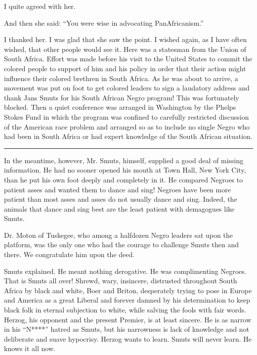 \documentclass[letterpaper,10pt,english]{jupyterBook}
\begin{document}
\sphinxAtStartPar
I quite agreed with her.

\sphinxAtStartPar
And then she said: “You were wise in advocating Pan\sphinxhyphen{}Africanism.”

\sphinxAtStartPar
I thanked her. I was glad that she saw the point. I wished again, as I have often wished, that other people would see it. Here was a statesman from the Union of South Africa. Effort was made before his visit to the United States to commit the colored people to support of him and his policy in order that their action might influence their colored brethren in South Africa. As he was about to arrive, a movement was put on foot to get colored leaders to sign a laudatory address and thank Jans Smuts for his South African Negro program! This was fortunately blocked. Then a quiet conference was arranged in Washington by the Phelps Stokes Fund in which the program was confined to carefully restricted discussion of the American race problem and arranged so as to include no single Negro who had been in South Africa or had expert knowledge of the South African situation.


\bigskip\hrule\bigskip


\sphinxAtStartPar
In the meantime, however, Mr. Smuts, himself, supplied a good deal of missing information. He had no sooner opened his mouth at Town Hall, New York City, than he put his own foot deeply and completely in it. He compared Negroes to patient asses and wanted them to dance and sing! Negroes have been more patient than most asses and asses do not usually dance and sing. Indeed, the animals that dance and sing best are the least patient with demagogues like Smuts.

\sphinxAtStartPar
Dr. Moton of Tuskegee, who among a half\sphinxhyphen{}dozen Negro leaders sat upon the platform, was the only one who had the courage to challenge Smuts then and there. We congratulate him upon the deed.

\sphinxAtStartPar
Smuts explained. He meant nothing derogative. He was complimenting Negroes. That is Smuts all over! Shrewd, wary, insincere, distrusted throughout South Africa by black and white, Boer and Briton, desperately trying to pose in Europe and America as a great Liberal and forever damned by his determination to keep black folk in eternal subjection to white, while salving the fools with fair words. Herzog, his opponent and the present Premier, is at least sincere. He is as narrow in his “N****” hatred as Smuts, but his narrowness is lack of knowledge and not deliberate and suave hypocrisy. Herzog wants to learn. Smuts will never learn. He knows it all now.
\end{document}
